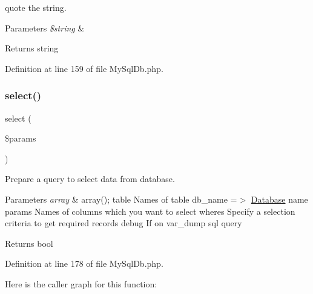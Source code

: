 quote the string.


\begin{DoxyParams}{Parameters}
{\em \$string} & \\
\hline
\end{DoxyParams}
\begin{DoxyReturn}{Returns}
string 
\end{DoxyReturn}


Definition at line 159 of file My\+Sql\+Db.\+php.

\mbox{\label{class_zest_1_1_database_1_1_drives_1_1_m_y_s_q_l_1_1_my_sql_db_aaade19290861bb3abf902bb14a51889b}} 
\subsubsection{\texorpdfstring{select()}{select()}}
{\footnotesize\ttfamily select (\begin{DoxyParamCaption}\item[{}]{\$params }\end{DoxyParamCaption})}

Prepare a query to select data from database.


\begin{DoxyParams}{Parameters}
{\em array} & array(); \textquotesingle{}table\textquotesingle{} Names of table \textquotesingle{}db\+\_\+name\textquotesingle{} =$>$ \mbox{\hyperlink{namespace_zest_1_1_database}{Database}} name \textquotesingle{}params\textquotesingle{} Names of columns which you want to select \textquotesingle{}wheres\textquotesingle{} Specify a selection criteria to get required records \textquotesingle{}debug\textquotesingle{} If on var\+\_\+dump sql query\\
\hline
\end{DoxyParams}
\begin{DoxyReturn}{Returns}
bool 
\end{DoxyReturn}


Definition at line 178 of file My\+Sql\+Db.\+php.

Here is the caller graph for this function\+:
\mbox{\label{class_zest_1_1_database_1_1_drives_1_1_m_y_s_q_l_1_1_my_sql_db_aacfc8ca52b10f139be3398f374cd01cb}} 
